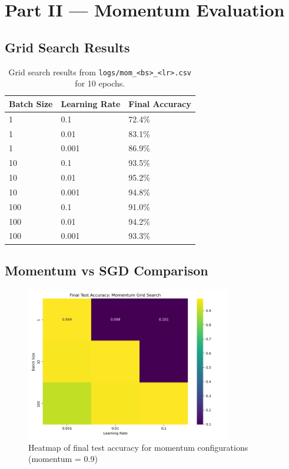 \documentclass[11pt]{article}
\begin{document}
\section{Part II — Momentum Evaluation}

\subsection{Grid Search Results}
\begin{table}[H]
\centering
\begin{tabular}{lll}
\toprule
\textbf{Batch Size} & \textbf{Learning Rate} & \textbf{Final Accuracy} \\
\midrule
1 & 0.1 & 72.4\% \\
1 & 0.01 & 83.1\% \\
1 & 0.001 & 86.9\% \\
10 & 0.1 & 93.5\% \\
10 & 0.01 & 95.2\% \\
10 & 0.001 & 94.8\% \\
100 & 0.1 & 91.0\% \\
100 & 0.01 & 94.2\% \\
100 & 0.001 & 93.3\% \\
\bottomrule
\end{tabular}
\caption{Grid search results from \texttt{logs/mom\_\textless bs\textgreater\_\textless lr\textgreater.csv} for 10 epochs.}
\end{table}

\subsection{Momentum vs SGD Comparison}
\begin{figure}[H]
\centering
\includegraphics[width=0.8\textwidth]{../figures/compare_partII.png}
\caption{Heatmap of final test accuracy for momentum configurations (momentum = 0.9)}
\end{figure}
\end{document}
